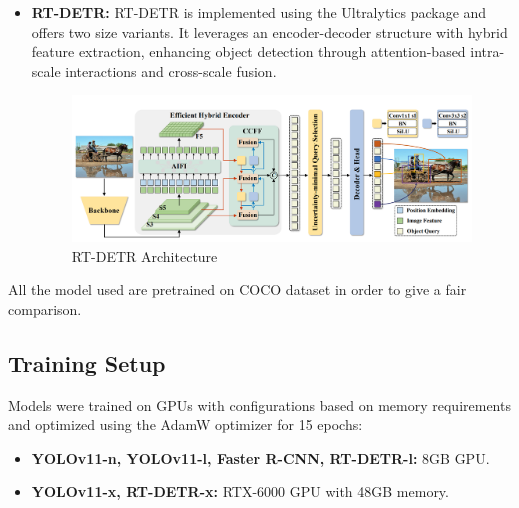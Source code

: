 \documentclass[a4paper]{article}
\begin{document}
\begin{itemize}
\begin{figure}[htbp]
    \end{figure}
    \item \textbf{RT-DETR\cite{3, 7}:} RT-DETR is implemented using the Ultralytics package and offers two size variants. It leverages an encoder-decoder structure with hybrid feature extraction, enhancing object detection through attention-based intra-scale interactions and cross-scale fusion.
    \begin{figure}[htbp]
        \centering
        \includegraphics[width=1.0\textwidth]{./images/rt_detr_arch.png}
        \caption{RT-DETR Architecture}
        \label{fig:Images}
    \end{figure}
\end{itemize}
All the model used are pretrained on COCO\cite{8} dataset in order to give a fair comparison.


\subsection{Training Setup}
Models were trained on GPUs with configurations based on memory requirements and optimized using the AdamW optimizer\cite{9} for 15 epochs:
\begin{itemize}
    \item \textbf{YOLOv11-n, YOLOv11-l, Faster R-CNN, RT-DETR-l:} 8GB GPU.
    \item \textbf{YOLOv11-x, RT-DETR-x:} RTX-6000 GPU with 48GB memory.
\end{itemize}
\end{document}
